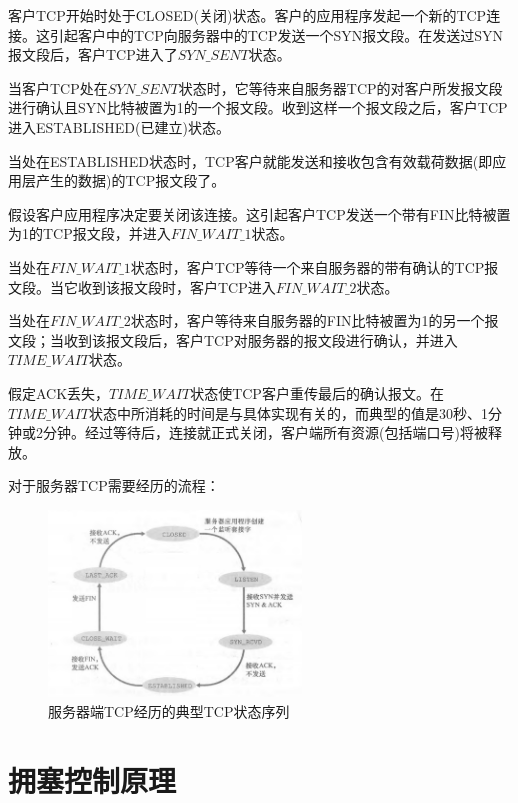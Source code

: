    

    客户TCP开始时处于CLOSED(关闭)状态。客户的应用程序发起一个新的TCP连接。这引起客户中的TCP向服务器中的TCP发送一个SYN报文段。在发送过SYN报文段后，客户TCP进入了$SYN\_SENT$状态。

    当客户TCP处在$SYN\_SENT$状态时，它等待来自服务器TCP的对客户所发报文段进行确认且SYN比特被置为1的一个报文段。收到这样一个报文段之后，客户TCP进入ESTABLISHED(已建立)状态。

    当处在ESTABLISHED状态时，TCP客户就能发送和接收包含有效载荷数据(即应用层产生的数据)的TCP报文段了。

    假设客户应用程序决定要关闭该连接。这引起客户TCP发送一个带有FIN比特被置为1的TCP报文段，并进入$FIN\_WAIT\_1$状态。

    当处在$FIN\_WAIT\_1$状态时，客户TCP等待一个来自服务器的带有确认的TCP报文段。当它收到该报文段时，客户TCP进入$FIN\_WAIT\_2$状态。

    当处在$FIN\_WAIT\_2$状态时，客户等待来自服务器的FIN比特被置为1的另一个报文段；当收到该报文段后，客户TCP对服务器的报文段进行确认，并进入$TIME\_WAIT$状态。

    假定ACK丢失，$TIME\_WAIT$状态使TCP客户重传最后的确认报文。在$TIME\_WAIT$状态中所消耗的时间是与具体实现有关的，而典型的值是30秒、1分钟或2分钟。经过等待后，连接就正式关闭，客户端所有资源(包括端口号)将被释放。

    对于服务器TCP需要经历的流程：

\begin{figure}[!htbp]
    \centering
    \includegraphics[width=0.6\textwidth]{image/chapter03/服务器TCP状态序列.png}
    \caption{服务器端TCP经历的典型TCP状态序列}
\end{figure}

\section{拥塞控制原理}

    